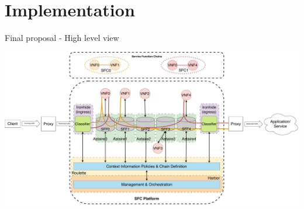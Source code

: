 \section{Implementation}
\begin{frame}{Final proposal - High level view}


  \includegraphics[page=1,scale=0.2]{res/images/finalreview}

\end{frame}